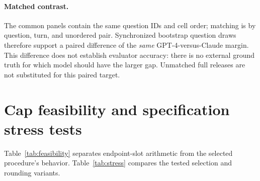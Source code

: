 \paragraph{Matched contrast.}
The common panels contain the same question IDs and cell order; matching is by question, turn, and unordered pair. Synchronized bootstrap question draws therefore support a paired difference of the \emph{same} GPT-4-versus-Claude margin. This difference does not establish evaluator accuracy: there is no external ground truth for which model should have the larger gap. Unmatched full releases are not substituted for this paired target.

\clearpage
\section{Cap feasibility and specification stress tests}\label{app:stress}
Table~\ref{tab:feasibility} separates endpoint-slot arithmetic from the selected procedure's behavior. Table~\ref{tab:stress} compares the tested selection and rounding variants.
\begin{table}[h]
\centering\small
\caption{Primary strict-cap arithmetic. Eligible rows are non-ties whose two endpoints have positive capacities, before considering their influence signs. Count upper bound is Eq.~\eqref{eq:countbound}; edges may reduce feasibility further. In NBA this upper bound already explains the one/two/one selected counts.}\label{tab:feasibility}


\end{table}

\begin{table}[h]
\centering\small
\caption{Exact edited fixed-pair margins at nominal 1\%. Adaptive U uses at most ten batches; Integer C optimizes the additive influence surrogate under strict caps. Cap+1 replaces every endpoint limit by $\lfloor\alpha n_i\rfloor+1$ while keeping the original global budget. Its larger realized $\rho$ demonstrates a changed restriction, not equivalent rounding.}\label{tab:stress}


\end{table}

\begin{table}[h]
\centering\small
\caption{Uncapped 1\% checks retain the original full-cohort pair. Each specification has its own $N$, unedited fit, degrees, and floor budget. A ``Base reversed'' flag means the unedited altered specification already reverses that pair. NBA tie dropping changes no rows; it is intentionally a null ablation.}\label{tab:specifications}


\end{table}

